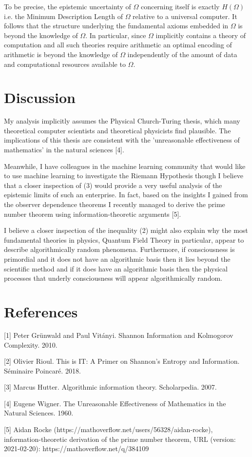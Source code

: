 \documentclass{article}
\begin{document}
To be precise, the epistemic uncertainty of $\Omega$ concerning itself is exactly $H(\Omega)$ i.e. the Minimum Description Length of $\Omega$ relative to a universal computer. It follows that the structure underlying the fundamental axioms embedded in $\Omega$ is beyond the knowledge of $\Omega$. In particular, since $\Omega$ implicitly contains a theory of computation and all such theories require arithmetic an optimal encoding of arithmetic is beyond the knowledge of $\Omega$ independently of the amount of data and computational resources available to $\Omega$.

\section{Discussion}

My analysis implicitly assumes the Physical Church-Turing thesis, which many theoretical computer scientists and theoretical physicists find plausible. The implications of this thesis are consistent with the 'unreasonable effectiveness of mathematics' in the natural sciences [4].

Meanwhile, I have colleagues in the machine learning community that would like to use machine learning to investigate the Riemann Hypothesis though I believe that a closer inspection of (3) would provide a very useful analysis of the epistemic limits of such an enterprise. In fact, based on the insights I gained from the observer dependence theorems I recently managed to derive the prime number theorem using information-theoretic arguments [5].

I believe a closer inspection of the inequality (2) might also explain why the most fundamental theories in physics, Quantum Field Theory in particular, appear to describe algorithmically random phenomena. Furthermore, if consciousness is primordial
and it does not have an algorithmic basis then it lies beyond the scientific method and if it does have an algorithmic basis
then the physical processes that underly consciousness will appear algorithmically random.

\section*{References}

\small
[1] Peter Grünwald and Paul Vitányi. Shannon Information and Kolmogorov Complexity. 2010.

[2] Olivier Rioul. This is IT: A Primer on Shannon’s Entropy and Information. Séminaire Poincaré. 2018.

[3] Marcus Hutter. Algorithmic information theory. Scholarpedia. 2007.

[4] Eugene Wigner. The Unreasonable Effectiveness of Mathematics in the Natural Sciences. 1960.

[5] Aidan Rocke (https://mathoverflow.net/users/56328/aidan-rocke), information-theoretic derivation of the prime number theorem, URL (version: 2021-02-20): https://mathoverflow.net/q/384109
\end{document}
